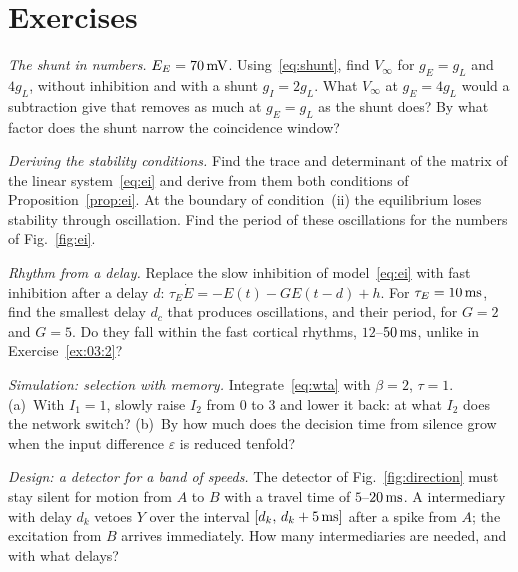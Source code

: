\section{Exercises}

\begin{exercise}[\lvlA]
\label{ex:03:1}
\emph{The shunt in numbers.} $E_E=70\,\text{mV}$. Using~\eqref{eq:shunt}, find $V_\infty$ for $g_E=g_L$ and $4g_L$, without inhibition and with a shunt $g_I=2g_L$. What $V_\infty$ at $g_E=4g_L$ would a subtraction give that removes as much at $g_E=g_L$ as the shunt does? By what factor does the shunt narrow the coincidence window?
\end{exercise}

\begin{exercise}[\lvlB]
\label{ex:03:2}
\emph{Deriving the stability conditions.} Find the trace and determinant of the matrix of the linear system~\eqref{eq:ei} and derive from them both conditions of Proposition~\ref{prop:ei}. At the boundary of condition~(ii) the equilibrium loses stability through oscillation. Find the period of these oscillations for the numbers of Fig.~\ref{fig:ei}.
\end{exercise}

\begin{exercise}[\lvlB]
\label{ex:03:3}
\emph{Rhythm from a delay.} Replace the slow inhibition of model~\eqref{eq:ei} with fast inhibition after a delay $d$: $\tau_E\dot E=-E(t)-GE(t-d)+h$. For $\tau_E=10\,\text{ms}$, find the smallest delay $d_c$ that produces oscillations, and their period, for $G=2$ and $G=5$. Do they fall within the fast cortical rhythms, $12$--$50\,\text{ms}$, unlike in Exercise~\ref{ex:03:2}?
\end{exercise}

\begin{exercise}[\lvlB]
\label{ex:03:4}
\emph{Simulation: selection with memory.} Integrate~\eqref{eq:wta} with $\beta=2$, $\tau=1$. (a)~With $I_1=1$, slowly raise $I_2$ from $0$ to $3$ and lower it back: at what $I_2$ does the network switch? (b)~By how much does the decision time from silence grow when the input difference $\varepsilon$ is reduced tenfold?
\end{exercise}

\begin{exercise}[\lvlB]
\label{ex:03:5}
\emph{Design: a detector for a band of speeds.} The detector of Fig.~\ref{fig:direction} must stay silent for motion from $A$ to $B$ with a travel time of $5$--$20\,\text{ms}$. A  intermediary with delay $d_k$ vetoes $Y$ over the interval $[d_k,\,d_k+5\,\text{ms}]$ after a spike from $A$; the excitation from $B$ arrives immediately. How many intermediaries are needed, and with what delays?
\end{exercise}

